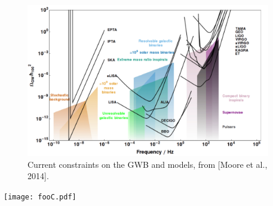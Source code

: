% 				
\begin{frame}
    
    	\begin{figure}[h]
			\centering
			\includegraphics[width=0.95\textwidth]{GWBplots}
			\scriptsize
			\caption{Current constraints on the GWB and models, from [Moore et al., 2014].}
			\label{output}
		\end{figure}
\texttt{[image: fooC.pdf]} \
\end{frame}



 






